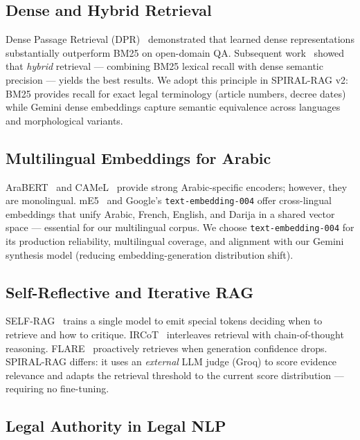 \documentclass[12pt,a4paper]{article}
\begin{document}
\subsection{Dense and Hybrid Retrieval}

Dense Passage Retrieval (DPR)~\cite{karpukhin2020dpr} demonstrated that learned
dense representations substantially outperform BM25 on open-domain QA. Subsequent
work~\cite{luan2021sparse} showed that \emph{hybrid} retrieval — combining BM25
lexical recall with dense semantic precision — yields the best results. We adopt
this principle in SPIRAL-RAG v2: BM25 provides recall for exact legal terminology
(article numbers, decree dates) while Gemini dense embeddings capture semantic
equivalence across languages and morphological variants.

\subsection{Multilingual Embeddings for Arabic}

AraBERT~\cite{antoun2020arabert} and CAMeL~\cite{inoue2021interplay} provide
strong Arabic-specific encoders; however, they are monolingual. mE5~\cite{wang2024me5}
and Google's \texttt{text-embedding-004} offer cross-lingual embeddings that
unify Arabic, French, English, and Darija in a shared vector space — essential
for our multilingual corpus. We choose \texttt{text-embedding-004} for its
production reliability, multilingual coverage, and alignment with our Gemini
synthesis model (reducing embedding-generation distribution shift).

\subsection{Self-Reflective and Iterative RAG}

SELF-RAG~\cite{asai2023selfrag} trains a single model to emit special tokens
deciding when to retrieve and how to critique. IRCoT~\cite{trivedi2022ircot}
interleaves retrieval with chain-of-thought reasoning. FLARE~\cite{jiang2023flare}
proactively retrieves when generation confidence drops. SPIRAL-RAG differs: it
uses an \emph{external} LLM judge (Groq) to score evidence relevance and adapts
the retrieval threshold to the current score distribution — requiring no fine-tuning.

\subsection{Legal Authority in Legal NLP}
\end{document}
